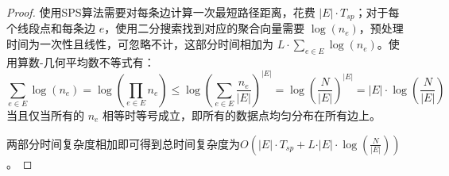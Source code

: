 \begin{proof}
	使用SPS算法需要对每条边计算一次最短路径距离，花费 $\vert E \vert \cdot T_{sp}$；对于每个线段点和每条边 $e$，使用二分搜索找到对应的聚合向量需要 $\log (n_e)$，预处理时间为一次性且线性，可忽略不计，这部分时间相加为 $L \cdot \sum_{e \in E} \log(n_e)$。使用算数-几何平均数不等式有：
	\begin{equation*}
		\sum_{e \in E} \log (n_e) = \log \left( \prod_{e \in E} n_e \right) \le \log \left( \sum_{e \in E} \frac{n_e}{\vert E \vert} \right)^{\vert E \vert} = \log \left( \frac{N}{\vert E \vert} \right)^{\vert E \vert} = \vert E \vert \cdot \log \left( \frac{N}{\vert E \vert} \right)
	\end{equation*}
	当且仅当所有的 $n_e$ 相等时等号成立，即所有的数据点均匀分布在所有边上。
	
	两部分时间复杂度相加即可得到总时间复杂度为$O(\vert E \vert \cdot T_{sp} + L \cdot \vert E \vert \cdot \log(\frac{N}{\vert E \vert}))$。
\end{proof}





